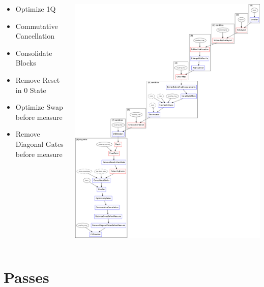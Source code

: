 \documentclass[aspectratio=169,11pt,hyperref={colorlinks=true}]{beamer}
\begin{document}
\begin{frame}
{\begin{columns}
\begin{itemize}
\begin{itemize}
                    \item Optimize 1Q
                    \item Commutative Cancellation
                    \item Consolidate Blocks
                    \item Remove Reset in 0 State
                    \item Optimize Swap before measure
                    \item Remove Diagonal Gates before measure
                \end{itemize}
        \end{itemize}
        \includegraphics[width=\textwidth,height=.95\textheight,keepaspectratio]{preset_level_3.png}
    \end{columns}
    }
\end{frame}

\section{Passes}
\end{document}
